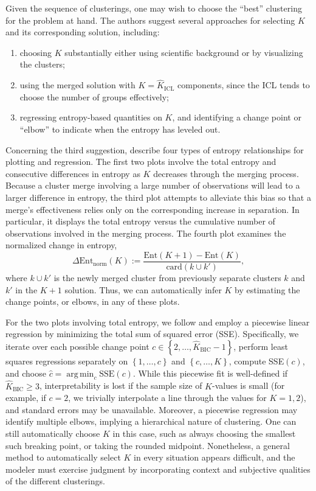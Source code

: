 \documentclass{uwstat572}
\newcommand*\set[1]{\left\{#1\right\}}
\newcommand*\estim[1]{\widehat{#1}}
\DeclareMathOperator*{\argmin}{arg\;min}
\renewcommand\;{\,}
\begin{document}
Given the sequence of clusterings, one may wish to choose the ``best'' clustering for the problem at hand.
The authors suggest several approaches for selecting $K$ and its corresponding solution, including:
\begin{enumerate}
\item
choosing $K$ substantially either using scientific background or by visualizing the clusters;
\item
using the merged solution with $K = \estim K_\text{ICL}$ components, since the ICL tends to choose the number of groups effectively;
\item
regressing entropy-based quantities on $K$, and identifying a change point or ``elbow'' to indicate when the entropy has leveled out.
\end{enumerate}
Concerning the third suggestion, \cite{Baudry10} describe four types of entropy relationships for plotting and regression.
The first two plots involve the total entropy and consecutive differences in entropy as $K$ decreases through the merging process.
Because a cluster merge involving a large number of observations will lead to a larger difference in entropy, the third plot attempts to alleviate this bias so that a merge's effectiveness relies only on the corresponding increase in separation.
In particular, it displays the total entropy versus the cumulative number of observations involved in the merging process.
The fourth plot examines the normalized change in entropy,
\begin{equation}
\Delta\text{Ent}_\text{norm}(K)
	:= \frac{ \text{Ent}(K + 1) - \text{Ent}(K) }{ \text{card}\left(k \cup k'\right) },
\end{equation}
where $k\cup k'$ is the newly merged cluster from previously separate clusters $k$ and $k'$ in the $K + 1$ solution.
Thus, we can automatically infer $K$ by estimating the change points, or elbows, in any of these plots.

For the two plots involving total entropy, we follow \cite{Baudry10} and employ a piecewise linear regression by minimizing the total sum of squared error (SSE).
Specifically, we iterate over each possible change point $c \in \set{2, \dotsc, \estim K_\text{BIC} - 1}$, perform least squares regressions separately on $\set{1, \dotsc, c}$ and $\set{c, \dotsc, K}$, compute SSE$(c)$, and choose $\estim c = \argmin_c \text{SSE}(c)$.
While this piecewise fit is well-defined if $\estim K_\text{BIC} \ge 3$, interpretability is lost if the sample size of $K$-values is small (for example, if $c = 2$, we trivially interpolate a line through the values for $K = 1, 2$), and standard errors may be unavailable.
Moreover, a piecewise regression may identify multiple elbows, implying a hierarchical nature of clustering.
One can still automatically choose $K$ in this case, such as always choosing the smallest such breaking point, or taking the rounded midpoint.
Nonetheless, a general method to automatically select $K$ in every situation 	appears difficult, and the modeler must exercise judgment by incorporating context and subjective qualities of the different clusterings.
\end{document}
